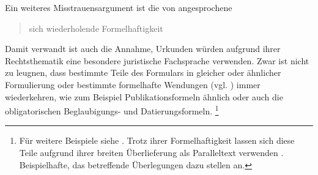 Ein weiteres Misstrauensargument ist die von \citeauthor{wegera2000}
angesprochene \blockcquote[1311]{wegera2000}{sich wiederholende
Formelhaftigkeit}. Damit verwandt ist auch die Annahme, Urkunden würden
aufgrund ihrer Rechtsthematik eine besondere juristische Fachsprache verwenden.
Zwar ist nicht zu leugnen, dass bestimmte Teile des Formulars in gleicher oder
ähnlicher Formulierung oder bestimmte formelhafte Wendungen (vgl.
) immer wiederkehren, wie zum Beispiel
Publikationsformeln ähnlich
oder auch die obligatorischen Beglaubigungs- und Datierungsformeln.%
%
	\footnote{Für weitere Beispiele siehe \citet[10, Anm.~5--8]{schulze2011}.
	Trotz ihrer Formelhaftigkeit lassen sich diese Teile aufgrund ihrer breiten
	Überlieferung als Paralleltext verwenden
	\autocite[siehe][]{cysouwwaelchli2007}. Beispielhafte, das \CAO{}
	betreffende Überlegungen dazu stellen \citet[174--175]{beckerschallert2022b} an.}
%
% 
% 
% 
